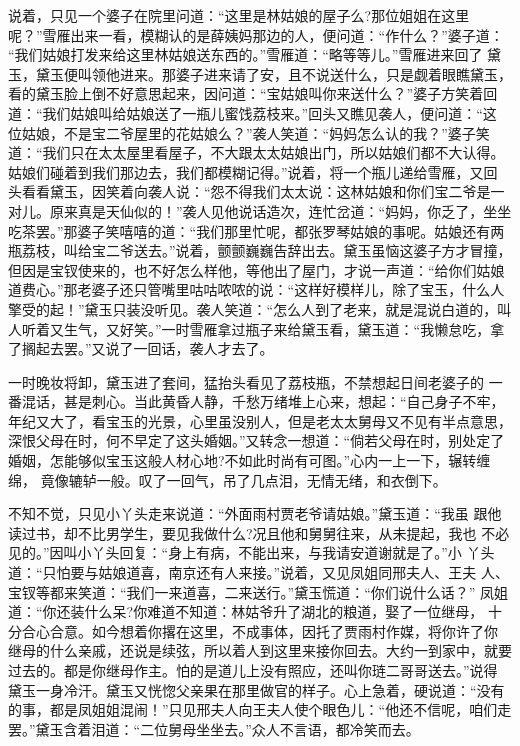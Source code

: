 说着，只见一个婆子在院里问道：“这里是林姑娘的屋子么?那位姐姐在这里
呢？”雪雁出来一看，模糊认的是薛姨妈那边的人，便问道：“作什么？”婆子道：
“我们姑娘打发来给这里林姑娘送东西的。”雪雁道：“略等等儿。”雪雁进来回了
黛玉，黛玉便叫领他进来。那婆子进来请了安，且不说送什么，只是觑着眼瞧黛玉，
看的黛玉脸上倒不好意思起来，因问道：“宝姑娘叫你来送什么？”婆子方笑着回
道：“我们姑娘叫给姑娘送了一瓶儿蜜饯荔枝来。”回头又瞧见袭人，便问道：“这
位姑娘，不是宝二爷屋里的花姑娘么？”袭人笑道：“妈妈怎么认的我？”婆子笑
道：“我们只在太太屋里看屋子，不大跟太太姑娘出门，所以姑娘们都不大认得。
姑娘们碰着到我们那边去，我们都模糊记得。”说着，将一个瓶儿递给雪雁，又回
头看看黛玉，因笑着向袭人说：“怨不得我们太太说：这林姑娘和你们宝二爷是一
对儿。原来真是天仙似的！”袭人见他说话造次，连忙岔道：“妈妈，你乏了，坐坐
吃茶罢。”那婆子笑嘻嘻的道：“我们那里忙呢，都张罗琴姑娘的事呢。姑娘还有两
瓶荔枝，叫给宝二爷送去。”说着，颤颤巍巍告辞出去。黛玉虽恼这婆子方才冒撞，
但因是宝钗使来的，也不好怎么样他，等他出了屋门，才说一声道：“给你们姑娘
道费心。”那老婆子还只管嘴里咕咕哝哝的说：“这样好模样儿，除了宝玉，什么人
擎受的起！”黛玉只装没听见。袭人笑道：“怎么人到了老来，就是混说白道的，叫
人听着又生气，又好笑。”一时雪雁拿过瓶子来给黛玉看，黛玉道：“我懒怠吃，拿
了搁起去罢。”又说了一回话，袭人才去了。

一时晚妆将卸，黛玉进了套间，猛抬头看见了荔枝瓶，不禁想起日间老婆子的
一番混话，甚是刺心。当此黄昏人静，千愁万绪堆上心来，想起：“自己身子不牢，
年纪又大了，看宝玉的光景，心里虽没别人，但是老太太舅母又不见有半点意思，
深恨父母在时，何不早定了这头婚姻。”又转念一想道：“倘若父母在时，别处定了
婚姻，怎能够似宝玉这般人材心地?不如此时尚有可图。”心内一上一下，辗转缠绵，
竟像辘轳一般。叹了一回气，吊了几点泪，无情无绪，和衣倒下。

不知不觉，只见小丫头走来说道：“外面雨村贾老爷请姑娘。”黛玉道：“我虽
跟他读过书，却不比男学生，要见我做什么?况且他和舅舅往来，从未提起，我也
不必见的。”因叫小丫头回复：“身上有病，不能出来，与我请安道谢就是了。”小
丫头道：“只怕要与姑娘道喜，南京还有人来接。”说着，又见凤姐同邢夫人、王夫
人、宝钗等都来笑道：“我们一来道喜，二来送行。”黛玉慌道：“你们说什么话？”
凤姐道：“你还装什么呆?你难道不知道：林姑爷升了湖北的粮道，娶了一位继母，
十分合心合意。如今想着你撂在这里，不成事体，因托了贾雨村作媒，将你许了你
继母的什么亲戚，还说是续弦，所以着人到这里来接你回去。大约一到家中，就要
过去的。都是你继母作主。怕的是道儿上没有照应，还叫你琏二哥哥送去。”说得
黛玉一身冷汗。黛玉又恍惚父亲果在那里做官的样子。心上急着，硬说道：“没有
的事，都是凤姐姐混闹！”只见邢夫人向王夫人使个眼色儿：“他还不信呢，咱们走
罢。”黛玉含着泪道：“二位舅母坐坐去。”众人不言语，都冷笑而去。

